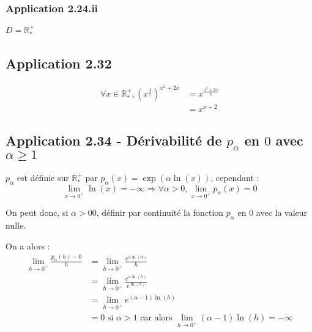 \documentclass{report}
\begin{document}
\subsubsection*{Application 2.24.ii}

$D=\mathbb{R}^{+}_*$


\subsection*{Application 2.32}
\begin{equation*}
	\begin{split}
		\forall x \in \mathbb{R}^{+}_{*}, \left(  x^{\frac{1}{x}} \right)^{x^2+2x}
		&= x^{\frac{x^2+2x}{x}} \\
		&= x^{x+2}
	\end{split}
\end{equation*}


\subsection*{Application 2.34 - Dérivabilité de $p_{\alpha}$ en $0$ avec $\alpha \geq 1$}

$p_{\alpha}$ est définie sur $\mathbb{R}^{+}_{*}$ par $p_{\alpha}(x) = \exp(\alpha \ln(x))$, cependant :
\begin{displaymath}
	\lim_{x\rightarrow 0^{+}} \ln(x) = -\infty \Longrightarrow\forall \alpha>0, \lim_{x\rightarrow 0^{+}} p_{\alpha}(x) = 0
\end{displaymath}

On peut donc, si $\alpha > 0 0$, définir par continuité la fonction $p_{\alpha}$ en $0$ avec la valeur nulle.

On a alors :
\begin{equation*}
	\begin{split}
		\lim_{h\rightarrow 0^{+}} \frac{p_{\alpha}(h) - 0}{h}
		&= \lim_{h\rightarrow 0^{+}} \frac{e^{\alpha \ln(h)}}{h} \\
		&= \lim_{h\rightarrow 0^{+}} \frac{e^{\alpha \ln(h)}}{e^{\ln(h)}} \\
		&= \lim_{h\rightarrow 0^{+}} e^{(\alpha-1) \ln(h)} \\
		&=0 \text{ si $\alpha >1$ car alors $\lim_{h\rightarrow 0^{+}} (\alpha-1) \ln(h) = -\infty$}
	\end{split}
\end{equation*}
\end{document}
